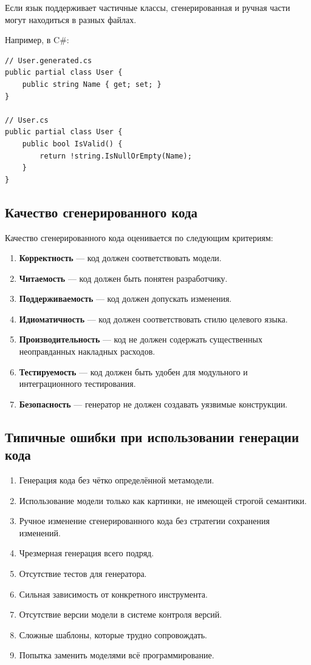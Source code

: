 \documentclass[12pt,a4paper]{article}
\begin{document}
Если язык поддерживает частичные классы, сгенерированная и ручная части могут находиться в разных файлах.

Например, в C\#:

\begin{verbatim}
// User.generated.cs
public partial class User {
    public string Name { get; set; }
}

// User.cs
public partial class User {
    public bool IsValid() {
        return !string.IsNullOrEmpty(Name);
    }
}
\end{verbatim}

\subsection{Качество сгенерированного кода}

Качество сгенерированного кода оценивается по следующим критериям:

\begin{enumerate}
    \item \textbf{Корректность} --- код должен соответствовать модели.
    \item \textbf{Читаемость} --- код должен быть понятен разработчику.
    \item \textbf{Поддерживаемость} --- код должен допускать изменения.
    \item \textbf{Идиоматичность} --- код должен соответствовать стилю целевого языка.
    \item \textbf{Производительность} --- код не должен содержать существенных неоправданных накладных расходов.
    \item \textbf{Тестируемость} --- код должен быть удобен для модульного и интеграционного тестирования.
    \item \textbf{Безопасность} --- генератор не должен создавать уязвимые конструкции.
\end{enumerate}

\subsection{Типичные ошибки при использовании генерации кода}

\begin{enumerate}
    \item Генерация кода без чётко определённой метамодели.
    \item Использование модели только как картинки, не имеющей строгой семантики.
    \item Ручное изменение сгенерированного кода без стратегии сохранения изменений.
    \item Чрезмерная генерация всего подряд.
    \item Отсутствие тестов для генератора.
    \item Сильная зависимость от конкретного инструмента.
    \item Отсутствие версии модели в системе контроля версий.
    \item Сложные шаблоны, которые трудно сопровождать.
    \item Попытка заменить моделями всё программирование.
\end{enumerate}
\end{document}
